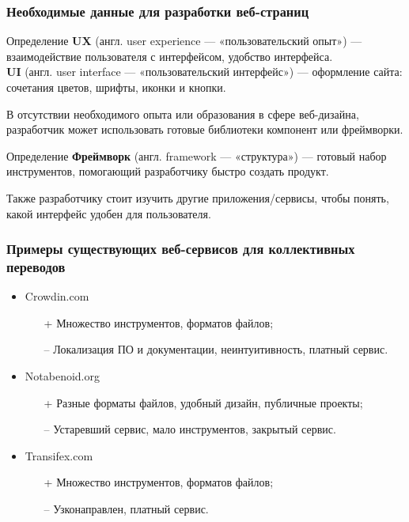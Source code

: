 \documentclass[hyperref={unicode}]{beamer}
\begin{document}
\begin{frame}
	\frametitle{Необходимые данные для разработки веб-страниц}
	\begin{block}{Определение}
		\textbf{UX} (англ. user experience — «пользовательский опыт») — взаимодействие пользователя с интерфейсом, удобство интерфейса. \\
		\textbf{UI} (англ. user interface — «пользовательский интерфейс») — оформление сайта: сочетания цветов, шрифты, иконки и кнопки.
	\end{block}
	В отсутствии необходимого опыта или образования в сфере веб-дизайна, разработчик может использовать готовые библиотеки компонент или фреймворки.
	\begin{block}{Определение}
	\textbf{Фреймворк} (англ. framework — «структура») — готовый набор инструментов, помогающий разработчику быстро создать продукт.
	\end{block}
	Также разработчику стоит изучить другие приложения/сервисы, чтобы понять, какой интерфейс удобен для пользователя.
\end{frame}


\begin{frame}
	\frametitle{Примеры существующих веб-сервисов для коллективных переводов}
	\begin{itemize}
		\item Crowdin.com
		\begin{itemize}
			\item[+] Множество инструментов, форматов файлов;
			\item[--] Локализация ПО и документации, неинтуитивность, платный сервис.
		\end{itemize}
		\item Notabenoid.org
		\begin{itemize}
			\item[+] Разные форматы файлов, удобный дизайн, публичные проекты;
			\item[--] Устаревший сервис, мало инструментов, закрытый сервис.
		\end{itemize}
		\item Transifex.com
		\begin{itemize}
			\item[+] Множество инструментов, форматов файлов;
			\item[--] Узконаправлен, платный сервис.
		\end{itemize}
	\end{itemize}
\end{frame}
\end{document}
